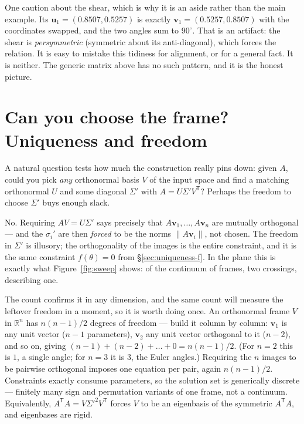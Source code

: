 \documentclass[11pt]{article}
\numberwithin{equation}{section}
\newcommand{\R}{\mathbb{R}}
\newcommand{\T}{^{\mathsf{T}}}
\newcommand{\vv}[1]{\mathbf{v}_{#1}}
\newcommand{\uu}[1]{\mathbf{u}_{#1}}
\theoremstyle{plainish}
\begin{document}
\noindent
One caution about the shear, which is why it is an aside rather than the main
example. Its $\uu1 = (0.8507, 0.5257)$ is exactly $\vv1 = (0.5257, 0.8507)$
with the coordinates swapped, and the two angles sum to $90^\circ$. That is an
artifact: the shear is \emph{persymmetric} (symmetric about its anti-diagonal),
which forces the relation. It is easy to mistake this tidiness for alignment,
or for a general fact. It is neither. The generic matrix above has no such
pattern, and it is the honest picture.

\section{Can you choose the frame? Uniqueness and freedom}
\label{sec:uniqueness}
\label{sec:choose}

A natural question tests how much the construction really pins down: given $A$,
could you pick \emph{any} orthonormal basis $V$ of the input space and find a
matching orthonormal $U$ and some diagonal $\Sigma'$ with $A = U \Sigma' V\T$?
Perhaps the freedom to choose $\Sigma'$ buys enough slack.

No. Requiring $AV = U\Sigma'$ says precisely that $A\vv1, \dots, A\vv n$ are
mutually orthogonal --- and the $\sigma_i'$ are then \emph{forced} to be the
norms $\|A\vv i\|$, not chosen. The freedom in $\Sigma'$ is illusory; the
orthogonality of the images is the entire constraint, and it is the same
constraint $f(\theta) = 0$ from \S\ref{sec:uniqueness-f}. In the plane this is
exactly what Figure~\ref{fig:sweep} shows: of the continuum of frames, two
crossings, describing one.

The count confirms it in any dimension, and the same count will measure the
leftover freedom in a moment, so it is worth doing once. An orthonormal frame
$V$ in $\R^n$ has $n(n-1)/2$ degrees of freedom --- build it column by column:
$\vv1$ is any unit vector ($n-1$ parameters), $\vv2$ any unit vector orthogonal
to it ($n-2$), and so on, giving $(n-1) + (n-2) + \dots + 0 = n(n-1)/2$. (For
$n=2$ this is $1$, a single angle; for $n=3$ it is $3$, the Euler angles.)
Requiring the $n$ images to be pairwise orthogonal imposes one equation per
pair, again $n(n-1)/2$. Constraints exactly consume parameters, so the solution
set is generically discrete --- finitely many sign and permutation variants of
one frame, not a continuum. Equivalently, $A\T A = V\Sigma'^2 V\T$ forces $V$ to
be an eigenbasis of the symmetric $A\T A$, and eigenbases are rigid.
\end{document}

